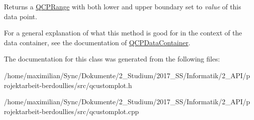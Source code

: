 Returns a \hyperlink{class_q_c_p_range}{Q\+C\+P\+Range} with both lower and upper boundary set to {\itshape value} of this data point.

For a general explanation of what this method is good for in the context of the data container, see the documentation of \hyperlink{class_q_c_p_data_container}{Q\+C\+P\+Data\+Container}. 

The documentation for this class was generated from the following files\+:\begin{DoxyCompactItemize}
\item 
/home/maximilian/\+Sync/\+Dokumente/2\+\_\+\+Studium/2017\+\_\+\+S\+S/\+Informatik/2\+\_\+\+A\+P\+I/projektarbeit-\/berdoullies/src/qcustomplot.\+h\item 
/home/maximilian/\+Sync/\+Dokumente/2\+\_\+\+Studium/2017\+\_\+\+S\+S/\+Informatik/2\+\_\+\+A\+P\+I/projektarbeit-\/berdoullies/src/qcustomplot.\+cpp\end{DoxyCompactItemize}
